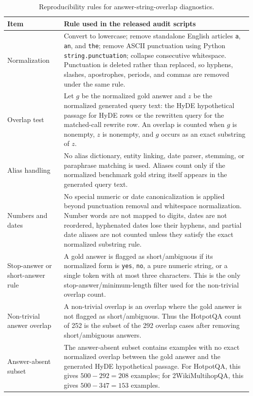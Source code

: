 \documentclass[10pt]{article}
\begin{document}
\begin{table}[t]
\centering
\caption{Reproducibility rules for answer-string-overlap diagnostics.}
\label{tab:answer_overlap_definition}
\scriptsize
\begin{threeparttable}
\setlength{\tabcolsep}{4pt}
\begin{tabularx}{\textwidth}{>{\raggedright\arraybackslash}p{}
                            >{\raggedright\arraybackslash}X}
\toprule
Item & Rule used in the released audit scripts \\
\midrule
Normalization & Convert to lowercase; remove standalone English articles \texttt{a}, \texttt{an}, and \texttt{the}; remove ASCII punctuation using Python \texttt{string.punctuation}; collapse consecutive whitespace. Punctuation is deleted rather than replaced, so hyphens, slashes, apostrophes, periods, and commas are removed under the same rule. \\
Overlap test & Let $g$ be the normalized gold answer and $z$ be the normalized generated query text: the HyDE hypothetical passage for HyDE rows or the rewritten query for the matched-call rewrite row. An overlap is counted when $g$ is nonempty, $z$ is nonempty, and $g$ occurs as an exact substring of $z$. \\
Alias handling & No alias dictionary, entity linking, date parser, stemming, or paraphrase matching is used. Aliases count only if the normalized benchmark gold string itself appears in the generated query text. \\
Numbers and dates & No special numeric or date canonicalization is applied beyond punctuation removal and whitespace normalization. Number words are not mapped to digits, dates are not reordered, hyphenated dates lose their hyphens, and partial date aliases are not counted unless they satisfy the exact normalized substring rule. \\
Stop-answer or short-answer rule & A gold answer is flagged as short/ambiguous if its normalized form is \texttt{yes}, \texttt{no}, a pure numeric string, or a single token with at most three characters. This is the only stop-answer/minimum-length filter used for the non-trivial overlap count. \\
Non-trivial answer overlap & A non-trivial overlap is an overlap where the gold answer is not flagged as short/ambiguous. Thus the HotpotQA count of 252 is the subset of the 292 overlap cases after removing short/ambiguous answers. \\
Answer-absent subset & The answer-absent subset contains examples with no exact normalized overlap between the gold answer and the generated HyDE hypothetical passage. For HotpotQA, this gives $500-292=208$ examples; for 2WikiMultihopQA, this gives $500-347=153$ examples. \\

\end{tabularx}
\end{threeparttable}
\end{table}
\end{document}
